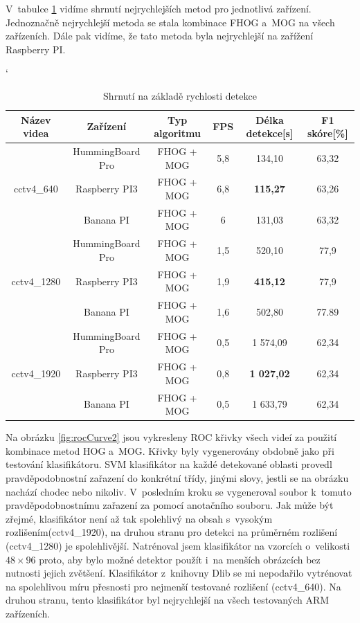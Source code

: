V~tabulce \ref{sumSpeTab} vidíme shrnutí nejrychlejších metod pro jednotlivá zařízení. Jednoznačně nejrychlejší metoda se stala kombinace FHOG a~MOG na všech zařízeních. Dále pak vidíme, že tato metoda byla nejrychlejší na zařížení Raspberry PI.
\begin{table}[H]
\catcode`
\centering
\caption{Shrnutí na základě rychlosti detekce}
\label{sumSpeTab}
\begin{tabular}{|c|c|c|c|c|c|}
\hline
{Název videa}               &{Zařízení}          & Typ algoritmu & FPS & Délka detekce[s] & F1 skóre[\%]  \\  \hline
\multirow{3}{*}{cctv4\_640} & HummingBoard Pro   & FHOG + MOG     & 5,8 & 134,10                    &  63,32       \\ \cline{2-6}  
                            & Raspberry PI3      & FHOG + MOG     & 6,8 & \textbf{115,27}           &  63,26       \\ \cline{2-6}  
                            & Banana PI          & FHOG + MOG     & 6   & 131,03                    &  63,32       \\ \hline \hline   
\multirow{3}{*}{cctv4\_1280}& HummingBoard Pro   & FHOG + MOG     & 1,5 & 520,10                    &  77,9        \\ \cline{2-6}  
                            & Raspberry PI3      & FHOG + MOG     & 1,9 & \textbf{415,12}           &  77,9        \\ \cline{2-6}  
                            & Banana PI          & FHOG + MOG     & 1,6 &  502,80                   &  77.89       \\ \hline \hline    
\multirow{3}{*}{cctv4\_1920}& HummingBoard Pro   & FHOG + MOG     & 0,5 & 1 574,09                  &  62,34       \\ \cline{2-6}  
                            & Raspberry PI3      & FHOG + MOG     & 0,8 & \textbf{1 027,02}         &  62,34       \\ \cline{2-6}  
                            & Banana PI          & FHOG + MOG     & 0,5 &  1 633,79                 &  62,34       \\ \hline
\end{tabular}
\end{table}


Na obrázku \ref{fig:rocCurve2} jsou vykresleny ROC křivky všech videí za použití kombinace metod HOG a~MOG. Křivky byly vygenerovány obdobně jako při testování klasifikátoru. SVM klasifikátor na každé detekované oblasti provedl pravděpodobnostní zařazení do konkrétní třídy, jinými slovy, jestli se na obrázku nachází chodec nebo nikoliv. V~posledním kroku se vygeneroval  soubor k~tomuto pravděpodobnostnímu zařazení za pomocí anotačního souboru. Jak může být zřejmé, klasifikátor není až tak spolehlivý na obsah s~vysokým rozlišením(cctv4\_1920), na druhou stranu pro detekci na průměrném rozlišení (cctv4\_1280) je spolehlivější. Natrénoval jsem klasifikátor na vzorcích o~velikosti $48\times96$ proto, aby bylo možné detektor použít i~na menších obrázcích bez nutnosti jejich zvětšení. Klasifikátor z~knihovny Dlib se mi nepodařilo vytrénovat na spolehlivou míru přesnosti pro nejmenší testované rozlišení (cctv4\_640). Na druhou stranu, tento klasifikátor byl nejrychlejší na všech testovaných ARM zařízeních.

